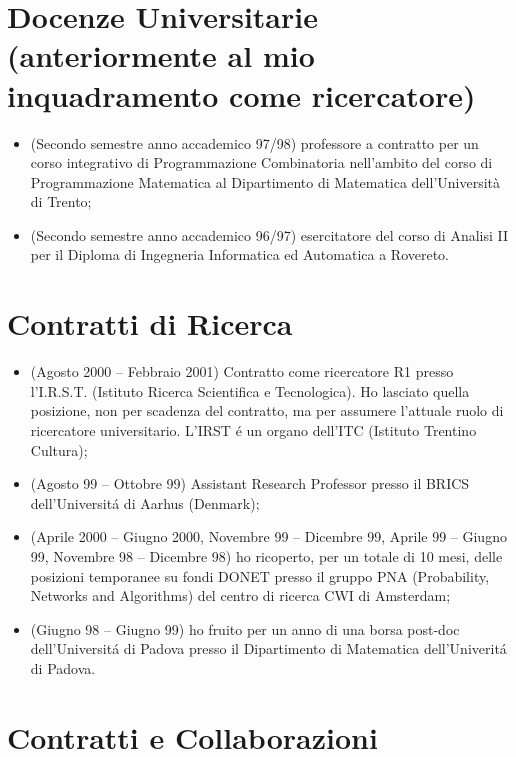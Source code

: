 \documentclass[11pt]{article}
\begin{document}
\section{Docenze Universitarie (anteriormente al mio inquadramento come ricercatore)}

\begin{itemize}
\item[] (Secondo semestre anno accademico 97/98)
     professore a contratto per 
     un corso integrativo di Programmazione Combinatoria
     nell'ambito del corso di Programmazione Matematica
     al Dipartimento di Matematica dell'Universit\`a di Trento;
\item[] (Secondo semestre anno accademico 96/97)
     esercitatore del corso di Analisi II
     per il Diploma di Ingegneria Informatica ed Automatica a Rovereto.
\end{itemize}


\section{Contratti di Ricerca}

\begin{itemize}
\item[] (Agosto 2000 -- Febbraio 2001)
     Contratto come ricercatore R1 presso l'I.R.S.T.
     (Istituto Ricerca Scientifica e Tecnologica).
     Ho lasciato quella posizione, non per scadenza del contratto,
     ma per assumere l'attuale ruolo
     di ricercatore universitario.
     L'IRST \'e un organo dell'ITC (Istituto Trentino Cultura);
\item[] (Agosto 99 -- Ottobre 99)
     Assistant Research Professor
     presso il  BRICS dell'Universit\'a di Aarhus (Denmark);
\item[] (Aprile 2000 -- Giugno 2000,
          Novembre 99 -- Dicembre 99,
          Aprile 99 -- Giugno 99,
          Novembre 98 -- Dicembre 98)
      ho ricoperto, per un totale di 10 mesi,
      delle posizioni temporanee su fondi DONET presso
      il gruppo PNA (Probability, Networks and Algorithms)
      del centro di ricerca CWI di Amsterdam;
\item[] (Giugno 98 -- Giugno 99)
      ho fruito per un anno di una borsa post-doc
      dell'Universit\'a di Padova
      presso il Dipartimento
      di Matematica dell'Univerit\'a di Padova.
\end{itemize}


\section{Contratti e Collaborazioni}
\end{document}
